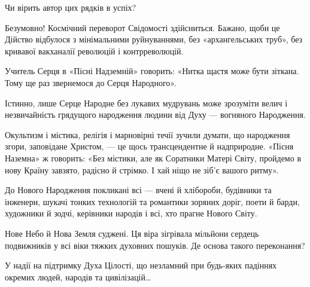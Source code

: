 Чи вірить автор цих рядків в успіх?

Безумовно! Космічний переворот Свідомості здійсниться. Бажано, щоби це Дійство
відбулося з мінімальними руйнуваннями, без «архангельських труб», без кривавої
вакханалії революцій і контрреволюцій.

Учитель Серця в «Пісні Надземній» говорить: «Нитка щастя може бути зіткана.
Тому ще раз звернемося до Серця Народного».

Істинно, лише Серце Народне без лукавих мудрувань може зрозуміти велич і
незвичайність грядущого народження людини від Духу — вогняного Народження.

Окультизм і містика, релігія і марновірні течії зучили думати, що народження
згори, заповідане Христом, — це щось трансцендентне й надприродне. «Пісня
Наземна» ж говорить: «Без містики, але як Соратники Матері Світу, пройдемо в
нову Країну завзято, радісно й стрімко. І хай ніщо не зіб’є вашого ритму».

До Нового Народження покликані всі — вчені й хлібороби, будівники та інженери,
шукачі тонких технологій та романтики зоряних доріг, поети й барди, художники й
зодчі, керівники народів і всі, хто прагне Нового Світу.

Нове Небо й Нова Земля суджені. Ця віра зігрівала мільйони сердець подвижників
у всі віки тяжких духовних пошуків. Де основа такого переконання?

У надії на підтримку Духа Цілості, що незламний при будь-яких падіннях окремих
людей, народів та цивілізацій…

